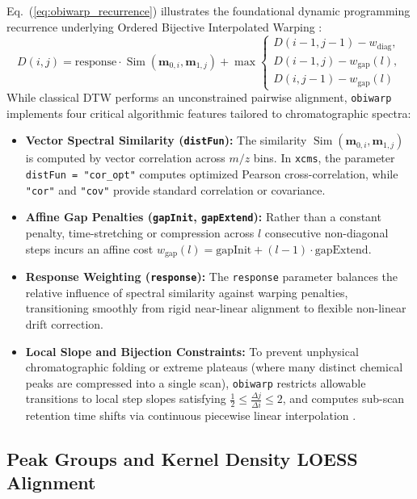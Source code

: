\documentclass[11pt,twoside,openright]{book}
\begin{document}
Eq.~(\ref{eq:obiwarp_recurrence}) illustrates the foundational dynamic programming recurrence underlying Ordered Bijective Interpolated Warping \cite{prince2006chromatographic}:
\begin{equation}
\label{eq:obiwarp_recurrence}
D(i, j) = \text{response} \cdot \operatorname{Sim}(\mathbf{m}_{0, i}, \mathbf{m}_{1, j}) + \max \begin{cases} 
D(i-1, j-1) - w_{\text{diag}}, \\ 
D(i-1, j) - w_{\text{gap}}(l), \\ 
D(i, j-1) - w_{\text{gap}}(l) 
\end{cases}
\end{equation}
While classical DTW performs an unconstrained pairwise alignment, \texttt{obiwarp} implements four critical algorithmic features tailored to chromatographic spectra:
\begin{itemize}
    \item \textbf{Vector Spectral Similarity (\texttt{distFun}):} The similarity $\operatorname{Sim}(\mathbf{m}_{0, i}, \mathbf{m}_{1, j})$ is computed by vector correlation across $m/z$ bins. In \texttt{xcms}, the parameter \texttt{distFun = "cor\_opt"} computes optimized Pearson cross-correlation, while \texttt{"cor"} and \texttt{"cov"} provide standard correlation or covariance.
    \item \textbf{Affine Gap Penalties (\texttt{gapInit}, \texttt{gapExtend}):} Rather than a constant penalty, time-stretching or compression across $l$ consecutive non-diagonal steps incurs an affine cost $w_{\text{gap}}(l) = \text{gapInit} + (l - 1) \cdot \text{gapExtend}$.
    \item \textbf{Response Weighting (\texttt{response}):} The \texttt{response} parameter balances the relative influence of spectral similarity against warping penalties, transitioning smoothly from rigid near-linear alignment to flexible non-linear drift correction.
    \item \textbf{Local Slope and Bijection Constraints:} To prevent unphysical chromatographic folding or extreme plateaus (where many distinct chemical peaks are compressed into a single scan), \texttt{obiwarp} restricts allowable transitions to local step slopes satisfying $\frac{1}{2} \le \frac{\Delta j}{\Delta i} \le 2$, and computes sub-scan retention time shifts via continuous piecewise linear interpolation \cite{prince2006chromatographic}.
\end{itemize}

\subsection{Peak Groups and Kernel Density LOESS Alignment}
\end{document}
